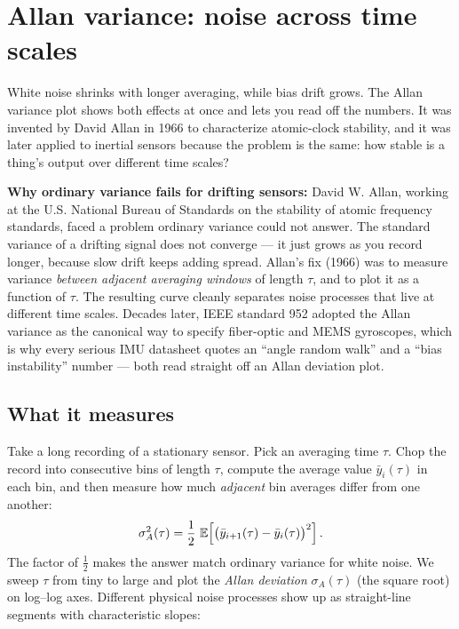 \section{Allan variance: noise across time scales}
\label{ch35:allan}

White noise shrinks with longer averaging, while bias drift grows. The Allan variance plot shows both effects at
once and lets you read off the numbers. It was invented by David Allan in 1966 to
characterize atomic-clock stability, and it was later applied to inertial sensors because
the problem is the same: how stable is a thing's output over different time
scales?

\begin{whybox}
\textbf{Why ordinary variance fails for drifting sensors:}
David W. Allan, working at the U.S. National Bureau of Standards on the stability
of atomic frequency standards, faced a problem ordinary variance could not
answer. The standard variance of a drifting signal does not converge --- it just
grows as you record longer, because slow drift keeps adding spread. Allan's
fix (1966) was to measure variance \emph{between adjacent averaging windows} of
length $\tau$, and to plot it as a function of $\tau$. The resulting curve cleanly
separates noise processes that live at different time scales. Decades later, IEEE
standard 952 adopted the Allan variance as the canonical way to specify
fiber-optic and MEMS gyroscopes, which is why every serious IMU datasheet quotes
an ``angle random walk'' and a ``bias instability'' number --- both read straight
off an Allan deviation plot.
\end{whybox}

\subsection{What it measures}
\label{ch35:allan-defn}

Take a long recording of a stationary sensor. Pick an averaging time $\tau$.
Chop the record into consecutive bins of length $\tau$, compute the average value
$\bar{y}_i(\tau)$ in each bin, and then measure how much \emph{adjacent} bin
averages differ from one another:
\begin{equation}
  \sigma_A^2(\tau) = \frac{1}{2}\,\operatorname{\mathbb{E}}\!\left[\bigl(\bar{y}_{i+1}(\tau) - \bar{y}_i(\tau)\bigr)^2\right].
  \label{ch35:allan-defn-eq}
\end{equation}
The factor of $\tfrac12$ makes the answer match ordinary variance for white
noise. We sweep $\tau$ from tiny to large and plot the \emph{Allan deviation}
$\sigma_A(\tau)$ (the square root) on log--log axes. Different physical noise
processes show up as straight-line segments with characteristic slopes:

